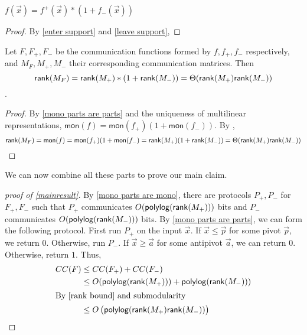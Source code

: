 \begin{proposition}\label{mono parts are parts}
	$f(\vec{x}) = f^+(\vec{x})*(1 +  f_-(\vec{x}))$
\end{proposition}
\begin{proof}
	By \ref{enter support} and \ref{leave support}, 
\end{proof}
\begin{corollary}\label{rank bound}
	Let $F,F_+,F_-$ be the communication functions formed by $f,f_+,f_-$ respectively, and $M_F,M_+,M_-$ their corresponding communication matrices. Then 
	\[
		\mathsf{rank}(M_F)=\mathsf{rank}(M_+) *(1 + \mathsf{rank}(M_-)) = \Theta(\mathsf{rank}(M_+)\mathsf{rank}(M_-))
	\].
\end{corollary}
\begin{proof}
	By \ref{mono parts are parts} and the uniqueness of multilinear representations, $\mathsf{mon}(f) = \mathsf{mon}(f_+)(1 + \mathsf{mon}(f_-))$. By \cite{Buhrman1999}, 
	\[
		\mathsf{rank}(M_F) = \mathsf{mon}(f) = \mathsf{mon}(f_+)(1 + \mathsf{mon}(f_-) = \mathsf{rank}(M_+)(1 + \mathsf{rank}(M_-)) = \Theta(\mathsf{rank}(M_+)\mathsf{rank}(M_-))
	\]
\end{proof}
We can now combine all these parts to prove our main claim.
\begin{proof}[proof of \ref{mainresult}]
	By \ref{mono parts are mono}, there are protocols $P_+,P_-$ for $F_+,F_-$ such that $P_+$ communicates $O(\mathsf{polylog}(\mathsf{rank}(M_+)))$ bits and $P_-$ communicates $O(\mathsf{polylog}(\mathsf{rank}(M_-)))$ bits. By \ref{mono parts are parts}, we can form the following protocol. First run $P_+$ on the input $\vec{x}$. If $\vec{x} \leq \vec{p}$ for some pivot $\vec{p}$, we return $0$. Otherwise, run $P_-$. If $\vec{x} \geq \vec{a}$ for some antipivot $\vec{a}$, we can return $0$. Otherwise, return $1$. Thus, 
	\begin{align*}
		CC(F) &\leq CC(F_+) + CC(F_-)\\
		 &\leq O(\mathsf{polylog}(\mathsf{rank}(M_+))) + \mathsf{polylog}(\mathsf{rank}(M_-)))\\
		 \intertext{By \ref{rank bound} and submodularity}
		 &\leq O\left(\mathsf{polylog}(\mathsf{rank}(M_+)\mathsf{rank}(M_-))\right)
	\end{align*}
\end{proof}

